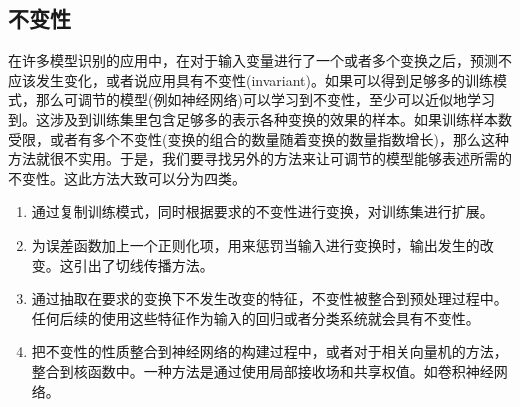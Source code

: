 \subsection*{不变性}
在许多模型识别的应用中，在对于输入变量进行了一个或者多个变换之后，预测不应该发生变化，或者说应用具有不变性(invariant)。如果可以得到足够多的训练模式，那么可调节的模型(例如神经网络)可以学习到不变性，至少可以近似地学习到。这涉及到训练集里包含足够多的表示各种变换的效果的样本。如果训练样本数受限，或者有多个不变性(变换的组合的数量随着变换的数量指数增长)，那么这种方法就很不实用。于是，我们要寻找另外的方法来让可调节的模型能够表述所需的不变性。这此方法大致可以分为四类。
\begin{enumerate}
	\item 通过复制训练模式，同时根据要求的不变性进行变换，对训练集进行扩展。
	\item 为误差函数加上一个正则化项，用来惩罚当输入进行变换时，输出发生的改变。这引出了切线传播方法。
	\item 通过抽取在要求的变换下不发生改变的特征，不变性被整合到预处理过程中。任何后续的使用这些特征作为输入的回归或者分类系统就会具有不变性。
	\item 把不变性的性质整合到神经网络的构建过程中，或者对于相关向量机的方法，整合到核函数中。一种方法是通过使用局部接收场和共享权值。如卷积神经网络。
\end{enumerate}
